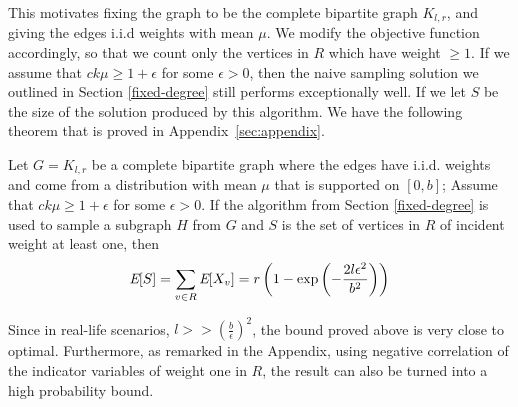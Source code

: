 This motivates fixing the graph to be the
complete bipartite graph $K_{l,r}$, and giving the edges i.i.d weights
with mean $\mu$. We modify the objective function accordingly, so that
we count only the vertices in $R$ which have weight $\geq 1$. If we
assume that $ck\mu \geq 1+\epsilon$ for some $\epsilon > 0$, then
the naive sampling solution we outlined in Section \ref{fixed-degree}
still performs exceptionally well. If we let $S$ be the size of the
solution produced by this algorithm. We have the following theorem that is
proved in Appendix~\ref{sec:appendix}.

\begin{thm}
Let $G=K_{l,r}$ be a complete bipartite graph where the edges have i.i.d. weights and come from a distribution with mean $\mu$ that is supported on $[0,b]$; Assume that $ck\mu \geq 1+\epsilon$ for some $\epsilon > 0$. If the algorithm from Section \ref{fixed-degree} is used to sample a subgraph $H$ from $G$ and $S$ is the set of vertices in $R$ of incident weight at least one, then
\[ \emph{\text{E}}[S] = \sum_{v\in R} \emph{\text{E}}[X_v] = r\left(1-\exp\left(-\frac{2l\epsilon^2}{b^2}\right)\right) \]
\end{thm}
Since in real-life scenarios, $l >> (\frac{b}{\epsilon})^2$, the bound proved above is very close to optimal. Furthermore, as remarked in the Appendix, using negative correlation of the indicator variables of weight one in $R$, the result can also be turned into a high probability bound.

